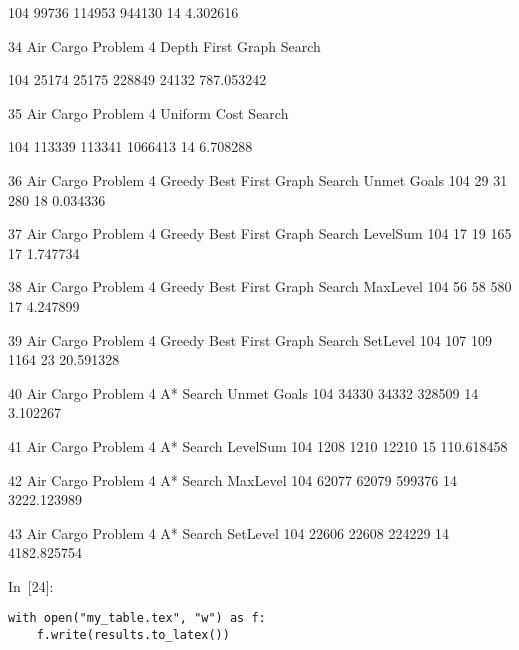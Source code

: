 \documentclass{article}
\begin{document}
      104
      99736
      114953
      944130
      14
      4.302616
    
    
      34
      Air Cargo Problem 4
      Depth First Graph Search
      
      104
      25174
      25175
      228849
      24132
      787.053242
    
    
      35
      Air Cargo Problem 4
      Uniform Cost Search
      
      104
      113339
      113341
      1066413
      14
      6.708288
    
    
      36
      Air Cargo Problem 4
      Greedy Best First Graph Search
      Unmet Goals
      104
      29
      31
      280
      18
      0.034336
    
    
      37
      Air Cargo Problem 4
      Greedy Best First Graph Search
      LevelSum
      104
      17
      19
      165
      17
      1.747734
    
    
      38
      Air Cargo Problem 4
      Greedy Best First Graph Search
      MaxLevel
      104
      56
      58
      580
      17
      4.247899
    
    
      39
      Air Cargo Problem 4
      Greedy Best First Graph Search
      SetLevel
      104
      107
      109
      1164
      23
      20.591328
    
    
      40
      Air Cargo Problem 4
      A* Search
      Unmet Goals
      104
      34330
      34332
      328509
      14
      3.102267
    
    
      41
      Air Cargo Problem 4
      A* Search
      LevelSum
      104
      1208
      1210
      12210
      15
      110.618458
    
    
      42
      Air Cargo Problem 4
      A* Search
      MaxLevel
      104
      62077
      62079
      599376
      14
      3222.123989
    
    
      43
      Air Cargo Problem 4
      A* Search
      SetLevel
      104
      22606
      22608
      224229
      14
      4182.825754
    
  












In~[24]:

    
\begin{verbatim}with open("my_table.tex", "w") as f:
    f.write(results.to_latex())
\end{verbatim}
\end{document}
